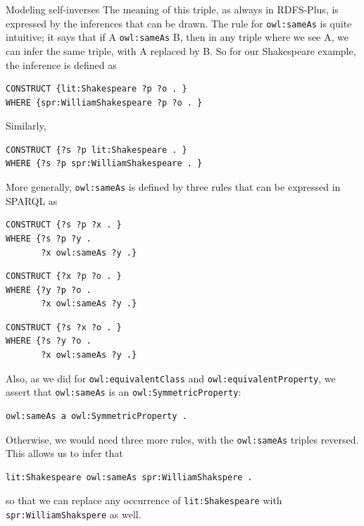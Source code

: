 \begin{challenge}{Modeling self-inverses}
The meaning of this triple, as always in RDFS-Plus, is expressed by the
inferences that can be drawn. The rule for \texttt{owl:sameAs} is quite
intuitive; it says that if A \texttt{owl:sameAs} B, then in any triple where we
see A, we can infer the same triple, with A replaced by B. So for our
Shakespeare example, the inference is defined as

\begin{lstlisting}
CONSTRUCT {lit:Shakespeare ?p ?o . }
WHERE {spr:WilliamShakespeare ?p ?o . }
\end{lstlisting}

Similarly,

\begin{lstlisting}
CONSTRUCT {?s ?p lit:Shakespeare . }
WHERE {?s ?p spr:WilliamShakespeare . }
\end{lstlisting}

More generally, \texttt{owl:sameAs} is defined by three rules that can be
expressed in SPARQL as

\begin{lstlisting}
CONSTRUCT {?s ?p ?x . }
WHERE {?s ?p ?y .
       ?x owl:sameAs ?y .}
\end{lstlisting}

\begin{lstlisting}
CONSTRUCT {?x ?p ?o . }
WHERE {?y ?p ?o .
       ?x owl:sameAs ?y .} 
\end{lstlisting}

\begin{lstlisting}
CONSTRUCT {?s ?x ?o . }
WHERE {?s ?y ?o .
       ?x owl:sameAs ?y .}
\end{lstlisting}

Also, as we did for \texttt{owl:equivalentClass} and \texttt{owl:equivalentProperty}, we
assert that \texttt{owl:sameAs} is an \texttt{owl:SymmetricProperty}:

\begin{lstlisting}
owl:sameAs a owl:SymmetricProperty .
\end{lstlisting}

Otherwise, we would need three more rules, with the \texttt{owl:sameAs} triples
reversed. This allows us to infer that

\begin{lstlisting}
lit:Shakespeare owl:sameAs spr:WilliamShakspere .
\end{lstlisting}

so that we can replace any occurrence of \texttt{lit:Shakespeare} with
\texttt{spr:WilliamShakspere}
as well.


\end{challenge}

